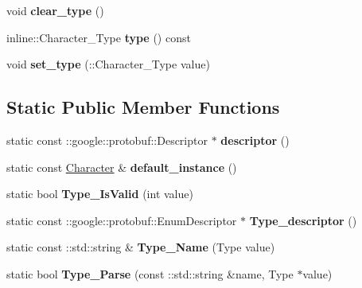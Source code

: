 \begin{DoxyCompactItemize}
\item 
void {\bfseries clear\+\_\+type} ()\hypertarget{classCharacter_a6728f262cb977cfb8fd4286bf732d123}{}\label{classCharacter_a6728f262cb977cfb8fd4286bf732d123}

\item 
inline\+::\+Character\+\_\+\+Type {\bfseries type} () const \hypertarget{classCharacter_a368e1162a1b70ca9bcf734166129c0d7}{}\label{classCharacter_a368e1162a1b70ca9bcf734166129c0d7}

\item 
void {\bfseries set\+\_\+type} (\+::Character\+\_\+\+Type value)\hypertarget{classCharacter_ab614cd2fc67962787d9ffb34603a12f3}{}\label{classCharacter_ab614cd2fc67962787d9ffb34603a12f3}

\end{DoxyCompactItemize}
\subsection*{Static Public Member Functions}
\begin{DoxyCompactItemize}
\item 
static const \+::google\+::protobuf\+::\+Descriptor $\ast$ {\bfseries descriptor} ()\hypertarget{classCharacter_af5ece1da02fa96963d539411dbc4b65f}{}\label{classCharacter_af5ece1da02fa96963d539411dbc4b65f}

\item 
static const \hyperlink{classCharacter}{Character} \& {\bfseries default\+\_\+instance} ()\hypertarget{classCharacter_ad616cfe1d5e99d64cf20493e6a122b68}{}\label{classCharacter_ad616cfe1d5e99d64cf20493e6a122b68}

\item 
static bool {\bfseries Type\+\_\+\+Is\+Valid} (int value)\hypertarget{classCharacter_a274d1d58f55e9638edccf9ff853e1b34}{}\label{classCharacter_a274d1d58f55e9638edccf9ff853e1b34}

\item 
static const \+::google\+::protobuf\+::\+Enum\+Descriptor $\ast$ {\bfseries Type\+\_\+descriptor} ()\hypertarget{classCharacter_a78c77f822371fc246c6439efdff4b330}{}\label{classCharacter_a78c77f822371fc246c6439efdff4b330}

\item 
static const \+::std\+::string \& {\bfseries Type\+\_\+\+Name} (Type value)\hypertarget{classCharacter_abdcb2b835976cdd52dfa7c8503ac67f5}{}\label{classCharacter_abdcb2b835976cdd52dfa7c8503ac67f5}

\item 
static bool {\bfseries Type\+\_\+\+Parse} (const \+::std\+::string \&name, Type $\ast$value)\hypertarget{classCharacter_a352fb6e1fa90d5cdc1790c32deb54f62}{}\label{classCharacter_a352fb6e1fa90d5cdc1790c32deb54f62}

\end{DoxyCompactItemize}

